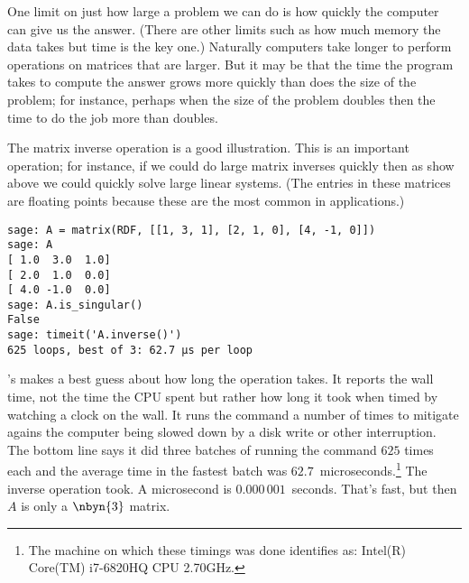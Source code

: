 One limit on just how large a problem we can do is how quickly 
the computer can give us the answer.
(There are other limits such as how much memory the data takes but 
time is the key one.)
Naturally computers take longer to perform operations 
on matrices that are larger.
But it may be that the time the program takes to compute the answer
grows more quickly than does the size of the problem; for instance, 
perhaps when the size of the problem doubles then the time to 
do the job more than doubles.

The matrix inverse operation is a good illustration.
This is an important operation; for instance, if we could do large matrix 
inverses
quickly then as show above we could quickly solve large linear systems.
(The entries in these matrices are floating points 
because these are the most common in applications.)
\begin{lstlisting}
sage: A = matrix(RDF, [[1, 3, 1], [2, 1, 0], [4, -1, 0]])
sage: A
[ 1.0  3.0  1.0]
[ 2.0  1.0  0.0]
[ 4.0 -1.0  0.0]
sage: A.is_singular()
False
sage: timeit('A.inverse()')
625 loops, best of 3: 62.7 μs per loop
\end{lstlisting}
\noindent
\Sage's  makes a best guess about how long
the operation takes.
It reports the wall time, not the time the CPU
spent but rather how long it took when timed
by watching a clock on the wall.
It runs the command 
a number of times to mitigate agains the
computer being slowed down by a 
disk write or other interruption.
The bottom line says it did three batches of running the command 
$625$ times each and the average time in the fastest batch
was $62.7$~microseconds.\footnote{%
  The machine on which these timings was done
  identifies as: Intel(R) Core(TM) i7-6820HQ CPU \@ 2.70GHz.}
The inverse operation took.
A microsecond is 
$0.000\,001$~seconds.
That's fast, but then $A$ is only a $\nbyn{3}$ matrix.

